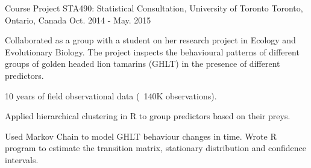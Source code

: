 

\begin{cventries}

  \cventry
    {Course Project} %
    {STA490: Statistical Consultation, University of Toronto} %
    {Toronto, Ontario, Canada} %
    {Oct. 2014 - May. 2015} %
    {
      \begin{cvitems} %
        \item {Collaborated as a group with a student on her research project in Ecology and Evolutionary Biology. The project inspects the behavioural patterns of different groups of golden headed lion tamarins (GHLT) in the presence of different predictors.}\\ 
        \begin{cvitems} 
          \item {10 years of field observational data (~140K observations).}
          \item {Applied hierarchical clustering in R to group predictors based on their preys.}
          \item {Used Markov Chain to model GHLT behaviour changes in time. Wrote R program to estimate the transition matrix, stationary distribution and confidence intervals.}\\
        \end{cvitems}
      \end{cvitems}
    }

\end{cventries}
